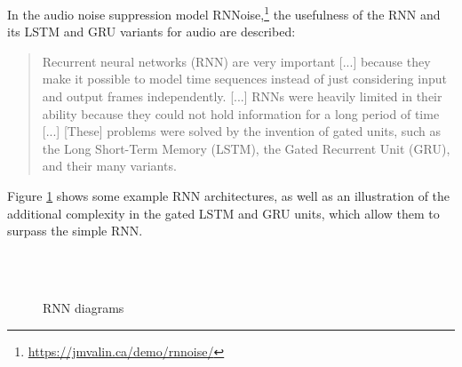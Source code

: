 \documentclass[report.tex]{subfiles}
\begin{document}
In the audio noise suppression model RNNoise,\footnote{\url{https://jmvalin.ca/demo/rnnoise/}} the usefulness of the RNN and its LSTM \parencite{lstm1} and GRU \parencite{gru1} variants for audio are described:

\begin{quote}
	Recurrent neural networks (RNN) are very important [...] because they make it possible to model time sequences instead of just considering input and output frames independently. [...] RNNs were heavily limited in their ability because they could not hold information for a long period of time [...] [These] problems were solved by the invention of gated units, such as the Long Short-Term Memory (LSTM), the Gated Recurrent Unit (GRU), and their many variants.
\end{quote}

Figure \ref{fig:rnndiags} shows some example RNN architectures, as well as an illustration of the additional complexity in the gated LSTM and GRU units, which allow them to surpass the simple RNN.

\begin{figure}[ht]
	\centering
	\\
	\\
	\caption{RNN diagrams}
	\label{fig:rnndiags}
\end{figure}
\end{document}
